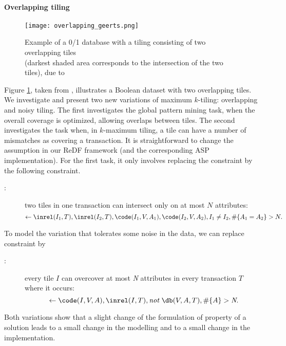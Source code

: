 \paragraph{Overlapping tiling}
\begin{figure}[thb]
  \begin{center}
  \texttt{[image: overlapping\_geerts.png]}
  \caption{Example of a 0/1 database with a tiling consisting of two overlapping tiles\\
  (darkest shaded area corresponds to the intersection of the two tiles), due to \cite{tiling}}
  \label{fig:geerts_overlapping}
\end{center}
\end{figure}
\label{subsubsec:overlapping_tiling}
Figure \ref{fig:geerts_overlapping}, taken from \cite{tiling}, illustrates a Boolean dataset with two overlapping tiles. We investigate and present two new variations of maximum $k$-tiling: overlapping and noisy tiling. The first investigates the global pattern mining task, when the overall coverage is optimized, allowing overlaps between tiles. The second investigates the task when, in $k$-maximum tiling, a tile can have a number of mismatches as covering a transaction. It is straightforward to change the assumption in our ReDF framework (and the corresponding ASP implementation). For the first task, it only involves replacing the constraint \intersectionConstraint by the following constraint.
\begin{description}
\item[\overlappingTilesConstraint:] two tiles in one transaction can intersect only on at most $N$ attributes:
\begin{equation*}
\leftarrow  \inrel(I_1,T), \inrel(I_2,T), \code(I_1,V,A_1), \code(I_2,V,A_2), I_1 \neq I_2, \# \{  A_1 = A_2\} > N.
\end{equation*}
\end{description}
To model the variation that tolerates some noise in the data, we can replace  constraint \overcoverageConstraint by 
\begin{description}
\item[\noiseConstraint:] every tile $I$ can overcover at most \textit{N} attributes in every transaction $T$ where it occurs: %
\begin{equation*}
\leftarrow  \code(I,V,A),\inrel(I,T), \textit{not}~ \db(V, A, T), \# \{ A \} > \textit{N}.
\end{equation*}
\end{description}
Both variations show that a slight change of the formulation of property of a solution leads to a small change in the modelling and to a small change in the implementation. 

